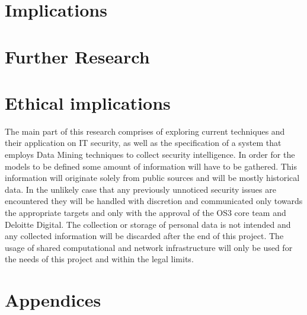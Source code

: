 \documentclass[12pt]{article}
\begin{document}
\section*{Implications}
\newpage
\section*{Further Research}
\newpage
\section*{Ethical implications}
The main part of this research comprises of exploring current techniques and their application on IT security, as well as the specification of a system that employs Data Mining techniques to collect security intelligence. In order for the models to be defined some amount of information will have to be gathered. This information will originate solely from public sources and will be mostly historical data. In the unlikely case that any previously unnoticed security issues are encountered they will be handled with discretion and communicated only towards the appropriate targets and only with the approval of the OS3 core team and Deloitte Digital. The collection or storage of personal data is not intended and any collected information will be discarded after the end of this project. The usage of shared computational and network infrastructure will only be used for the needs of this project and within the legal limits.
\newpage
\section*{Appendices}
\newpage
\end{document}
